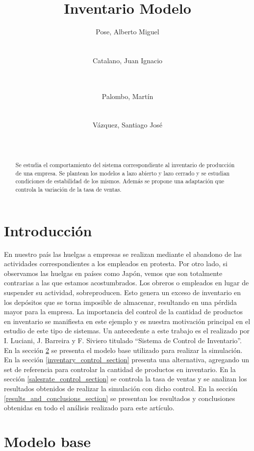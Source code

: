 \documentclass{sig-alternate}
\title{Inventario Modelo}
\author{
\alignauthor
Pose, Alberto Miguel\\
       \affaddr{Instituto Tecnológico de Buenos Aires}\\
       \affaddr{Buenos Aires, Argentina}\\
       \email{apose@alu.itba.edu.ar}
\alignauthor
Catalano, Juan Ignacio\\
       \affaddr{Instituto Tecnológico de Buenos Aires}\\
       \affaddr{Buenos Aires, Argentina}\\
       \email{jcatalan@alu.itba.edu.ar}
\and
\alignauthor 
Palombo, Martín\\
       \affaddr{Instituto Tecnológico de Buenos Aires}\\
       \affaddr{Buenos Aires, Argentina}\\
       \email{mpalombo@alu.itba.edu.ar}
\alignauthor 
Vázquez, Santiago José\\
       \affaddr{Instituto Tecnológico de Buenos Aires}\\
       \affaddr{Buenos Aires, Argentina}\\
       \email{savazque@alu.itba.edu.ar}
}
\date{}
\begin{document}
\maketitle

\begin{abstract}
Se estudia el comportamiento del sistema correspondiente al inventario de producción de una empresa. Se plantean los modelos a lazo abierto y
lazo cerrado y se estudian condiciones de estabilidad de los mismos. Además se propone una adaptación que controla la variación de la tasa
de ventas.
\end{abstract}

\section{Introducción}
\label{intro_section}
En nuestro país las huelgas a empresas se realizan mediante el abandono de las actividades correspondientes a los empleados en protesta. Por otro
lado, si observamos las huelgas en países como Japón, vemos que son totalmente contrarias a las que estamos acostumbrados. Los obreros o empleados
en lugar de suspender su actividad, sobreproducen. Esto genera un exceso de inventario en los depósitos que se torna imposible de almacenar,
resultando en una pérdida mayor para la empresa. La importancia del control de la cantidad de productos en inventario se manifiesta en este
ejemplo y es nuestra motivación principal en el estudio de este tipo de sistemas. Un antecedente a este trabajo es el realizado por I. Luciani, J. Barreira y
F. Siviero titulado ``Sistema de Control de Inventario''\cite{iluciani}.\\ 
En la sección \ref{model_section} se presenta el modelo base utilizado para realizar la simulación. En la sección \ref{inventary_control_section} presenta una alternativa, 
agregando un set de referencia para controlar la cantidad de productos en inventario. En la sección \ref{salesrate_control_section} se controla
la tasa de ventas y se analizan los resultados obtenidos de realizar la simulación con dicho control. En la sección \ref{results_and_conclusions_section}
se presentan los resultados y conclusiones obtenidas en todo el análisis realizado para este artículo.

\section{Modelo base}
\label{model_section}
\end{document}
